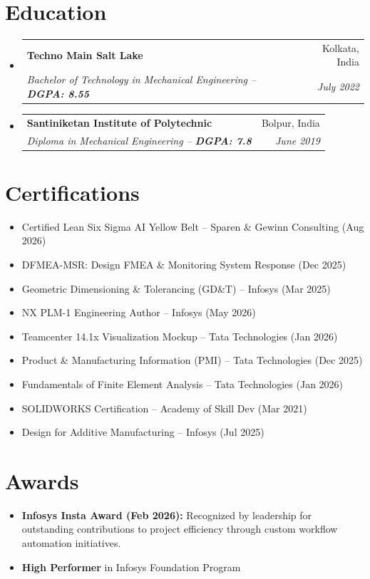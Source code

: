 \documentclass[letterpaper,10pt]{article}
\makeatletter
\newcommand{\resumeSubheading}[4]{
  \vspace{-1pt}\item
    \begin{tabular*}{0.97\textwidth}[t]{l@{\extracolsep{\fill}}r}
      \textbf{#1} & #2 \\
      \textit{\small#3} & \textit{\small #4} \\
    \end{tabular*}\vspace{-5pt}
}
\newcommand{\resumeSubHeadingListStart}{\begin{itemize}[leftmargin=0.15in, label={}]}
\newcommand{\resumeSubHeadingListEnd}{\end{itemize}}
\makeatother
\begin{document}
\section{Education}
  \resumeSubHeadingListStart
    \resumeSubheading
      {Techno Main Salt Lake}{Kolkata, India}
      {Bachelor of Technology in Mechanical Engineering -- \textbf{DGPA: 8.55}}{July 2022}
    \resumeSubheading
      {Santiniketan Institute of Polytechnic}{Bolpur, India}
      {Diploma in Mechanical Engineering -- \textbf{DGPA: 7.8}}{June 2019}
  \resumeSubHeadingListEnd

\section{Certifications}
 \begin{itemize}[leftmargin=0.15in, label={}]
    \item \small{Certified Lean Six Sigma AI Yellow Belt -- Sparen \& Gewinn Consulting (Aug 2026)}
    \vspace{-6pt}
    \item \small{DFMEA-MSR: Design FMEA \& Monitoring System Response (Dec 2025)}
    \vspace{-6pt}
    \item \small{Geometric Dimensioning \& Tolerancing (GD\&T) -- Infosys (Mar 2025)}
    \vspace{-6pt}
    \item \small{NX PLM-1 Engineering Author -- Infosys (May 2026)}
    \vspace{-6pt}
    \item \small{Teamcenter 14.1x Visualization Mockup -- Tata Technologies (Jan 2026)}
    \vspace{-6pt}
    \item \small{Product \& Manufacturing Information (PMI) -- Tata Technologies (Dec 2025)}
    \vspace{-6pt}
    \item \small{Fundamentals of Finite Element Analysis -- Tata Technologies (Jan 2026)}
    \vspace{-6pt}
    \item \small{SOLIDWORKS Certification -- Academy of Skill Dev (Mar 2021)}
    \vspace{-6pt}
    \item \small{Design for Additive Manufacturing -- Infosys (Jul 2025)}
 \end{itemize}

\section{Awards}
 \begin{itemize}[leftmargin=0.15in, label={}]
    \item \small{\textbf{Infosys Insta Award (Feb 2026):} Recognized by leadership for outstanding contributions to project efficiency through custom workflow automation initiatives.}
    \vspace{-4pt}
    \item \small{\textbf{High Performer} in Infosys Foundation Program}
 \end{itemize}
\end{document}
